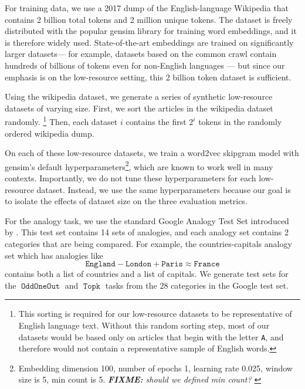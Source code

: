 \documentclass[11pt,a4paper]{article}
\DeclareMathOperator{\OddOneOut}{\texttt{OddOneOut}}
\DeclareMathOperator{\topk}{\texttt{Topk}}
\newcommand{\fixme}[1]{{\color{red}\itshape \textbf{FIXME:} {#1}}}
\begin{document}
For training data, we use a 2017 dump of the English-language Wikipedia 
that contains 2 billion total tokens and 2 million unique tokens.
The dataset is freely distributed with the popular gensim library \cite{rehurek_lrec} for training word embeddings,
and it is therefore widely used.
State-of-the-art embeddings are trained on significantly larger datasets---%
for example, datasets based on the common crawl contain hundreds of billions of tokens even for non-English languages \cite{buck2014n,grave2018learning}---%
but since our emphasis is on the low-resource setting,
this 2 billion token dataset is sufficient.

Using the wikipedia dataset, we generate a series of synthetic low-resource datasets of varying size.
First, we sort the articles in the wikipedia dataset randomly.%
\footnote{
    This sorting is required for our low-resource datasets to be representative of English language text.
    Without this random sorting step,
    most of our datasets would be based only on articles that begin with the letter \texttt{A},
    and therefore would not contain a representative sample of English words.
}
Then, each dataset $i$ contains the first $2^i$ tokens in the randomly ordered wikipedia dump.

On each of these low-resource datasets,
we train a word2vec skipgram model with gensim's default hyperparameters\footnote{
Embedding dimension 100, number of epochs 1, learning rate 0.025, window size is 5, min count is 5.
\fixme{
    should we defined min count?
}
},
which are known to work well in many contexts.
Importantly, we do not tune these hyperparameters for each low-resource dataset.
Instead, we use the same hyperparameters because our goal is to isolate the effects of dataset size on the three evaluation metrics.

For the analogy task, we use the standard Google Analogy Test Set introduced by \citep{mikolov2013efficient}.
This test set contains 14 sets of analogies,
and each analogy set contains 2 categories that are being compared.
For example,
the countries-capitals analogy set which has analogies like
\begin{equation}
\texttt{England} - \texttt{London} + \texttt{Paris} \approx \texttt{France}
\end{equation}
contains both a list of countries and a list of capitals.
We generate test sets for the $\OddOneOut$ and $\topk$ tasks from the 28 categories in the Google test set.
\end{document}
